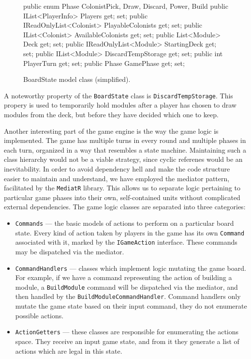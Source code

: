 \begin{figure}[ht]
\begin{code}
    public enum Phase { ColonistPick, Draw, Discard, Power, Build }
    public IList<PlayerInfo> Players { get; set; }
    public IReadOnlyList<Colonist> PlayableColonists { get; set; }
    public IList<Colonist> AvailableColonists { get; set; }
    public List<Module> Deck { get; set; }
    public IReadOnlyList<Module> StartingDeck { get; set; }
    public IList<Module> DiscardTempStorage { get; set; }
    public int PlayerTurn { get; set; }
    public Phase GamePhase { get; set; }
\end{code}
\caption{BoardState model class (simplified).}\label{dd:boardstate}
\end{figure}

A noteworthy property of the \texttt{BoardState} class is \texttt{DiscardTempStorage}.
This propery is used to temporarily hold modules after a player has chosen to draw
modules from the deck, but before they have decided which one to keep.

Another interesting part of the game engine is the way the game logic is implemented.
The game has multiple turns in every round and multiple phases in each turn,
organized in a way that resembles a state machine. Maintaining such a class hierarchy
would not be a viable strategy, since cyclic referenes would be an inevitability.
In order to avoid dependency hell and make the code structure easier to maintain
and understand, we have employed the mediator pattern, facilitated by the
\texttt{MediatR} library. This allows us to separate logic pertaining
to particular game phases into their own, self-contained units without complicated
external dependencies. The game logic classes are separated into three categories:
\begin{itemize}
    \item \texttt{Commands} --- the basic models of actions to perform on
        a particular board state. Every kind of action taken by players in the game
        has its own \texttt{Command} associated with it, marked by the
        \texttt{IGameAction} interface. These commands may be dispatched via
        the mediator.
    \item \texttt{CommandHandlers} --- classes which implement logic mutating
        the game board. For example, if we have a command representing the action
        of building a module, a \texttt{BuildModule} command will be dispatched
        via the mediator, and then handled by the \texttt{BuildModuleCommandHandler}.
        Command handlers only mutate the game state based on their input command,
        they do not enumerate possible actions. 
    \item \texttt{ActionGetters} --- these classes are responsible for
        enumerating the actions space. They receive an input game state,
        and from it they generate a list of actions which are legal
        in this state. 
\end{itemize}

